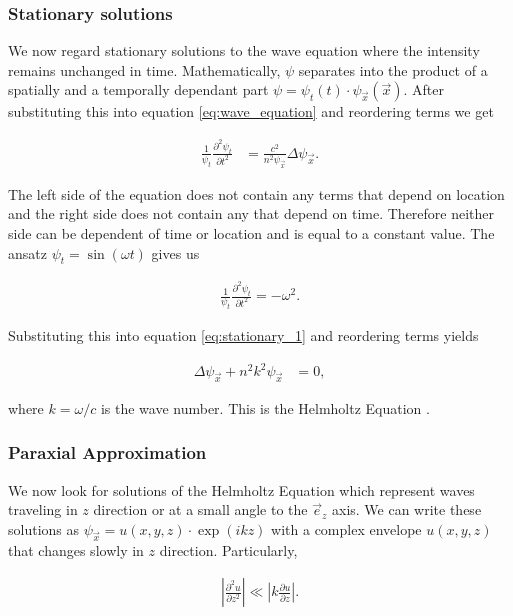 \subsubsection{Stationary solutions}

We now regard stationary solutions to the wave equation where the intensity remains unchanged in time. Mathematically, $\psi$ separates into the product of a spatially and a temporally dependant part $\psi = \psi_t(t) \cdot \psi_{\vec x}(\vec x)$. After substituting this into equation \eqref{eq:wave_equation} and reordering terms we get

\begin{align}  \label{eq:stationary_1}
\frac{1}{\psi_t} \frac{ \partial^2 \psi_t }{ \partial t^2 } & = \frac{c^2}{n^2 \psi_{\vec x}} \Delta \psi_{\vec x}.
\end{align}

The left side of the equation does not contain any terms that depend on location and the right side does not contain any that depend on time. Therefore neither side can be dependent of time or location and is equal to a constant value. The ansatz $\psi_t = \sin(\omega t)$ gives us

\begin{align*} 
\frac{1}{\psi_t} \frac{ \partial^2 \psi_t }{ \partial t^2 } = -\omega^2. 
\end{align*}

Substituting this into equation \eqref{eq:stationary_1} and reordering terms yields

\begin{align} \label{eq:helmholtz}
\Delta \psi_{\vec{x}} + n^2 k^2 \psi_{\vec{x}} & = 0,
\end{align}

where $k = \omega / c$ is the wave number. This is the Helmholtz Equation \cite{PriciplesOfOptics}.


\subsubsection{Paraxial Approximation} \label{sec:paraxial_equation}

We now look for solutions of the Helmholtz Equation which represent waves traveling in $z$ direction or at a small angle to the $\vec{e}_z$ axis. We can write these solutions as $\psi_{\vec{x}} = u(x,y,z) \cdot \exp(i k z)$ with a complex envelope $u(x,y,z)$ that changes slowly in $z$ direction. Particularly,

\begin{align*}
\left| \frac{\partial^2 u}{\partial z^2} \right| \ll \left|  k \frac{\partial u}{\partial z}  \right|.
\end{align*}

